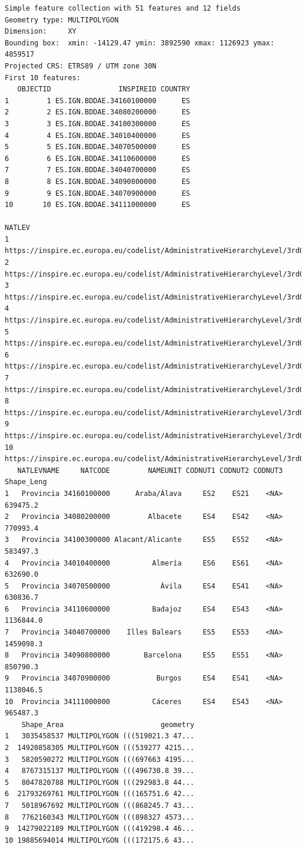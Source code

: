 \documentclass[
  letterpaper,
  DIV=11,
  numbers=noendperiod]{scrreprt}
\begin{document}
\begin{verbatim}
Simple feature collection with 51 features and 12 fields
Geometry type: MULTIPOLYGON
Dimension:     XY
Bounding box:  xmin: -14129.47 ymin: 3892590 xmax: 1126923 ymax: 4859517
Projected CRS: ETRS89 / UTM zone 30N
First 10 features:
   OBJECTID                INSPIREID COUNTRY
1         1 ES.IGN.BDDAE.34160100000      ES
2         2 ES.IGN.BDDAE.34080200000      ES
3         3 ES.IGN.BDDAE.34100300000      ES
4         4 ES.IGN.BDDAE.34010400000      ES
5         5 ES.IGN.BDDAE.34070500000      ES
6         6 ES.IGN.BDDAE.34110600000      ES
7         7 ES.IGN.BDDAE.34040700000      ES
8         8 ES.IGN.BDDAE.34090800000      ES
9         9 ES.IGN.BDDAE.34070900000      ES
10       10 ES.IGN.BDDAE.34111000000      ES
                                                                        NATLEV
1  https://inspire.ec.europa.eu/codelist/AdministrativeHierarchyLevel/3rdOrder
2  https://inspire.ec.europa.eu/codelist/AdministrativeHierarchyLevel/3rdOrder
3  https://inspire.ec.europa.eu/codelist/AdministrativeHierarchyLevel/3rdOrder
4  https://inspire.ec.europa.eu/codelist/AdministrativeHierarchyLevel/3rdOrder
5  https://inspire.ec.europa.eu/codelist/AdministrativeHierarchyLevel/3rdOrder
6  https://inspire.ec.europa.eu/codelist/AdministrativeHierarchyLevel/3rdOrder
7  https://inspire.ec.europa.eu/codelist/AdministrativeHierarchyLevel/3rdOrder
8  https://inspire.ec.europa.eu/codelist/AdministrativeHierarchyLevel/3rdOrder
9  https://inspire.ec.europa.eu/codelist/AdministrativeHierarchyLevel/3rdOrder
10 https://inspire.ec.europa.eu/codelist/AdministrativeHierarchyLevel/3rdOrder
   NATLEVNAME     NATCODE         NAMEUNIT CODNUT1 CODNUT2 CODNUT3 Shape_Leng
1   Provincia 34160100000      Araba/Álava     ES2    ES21    <NA>   639475.2
2   Provincia 34080200000         Albacete     ES4    ES42    <NA>   770993.4
3   Provincia 34100300000 Alacant/Alicante     ES5    ES52    <NA>   583497.3
4   Provincia 34010400000          Almería     ES6    ES61    <NA>   632690.0
5   Provincia 34070500000            Ávila     ES4    ES41    <NA>   630836.7
6   Provincia 34110600000          Badajoz     ES4    ES43    <NA>  1136844.0
7   Provincia 34040700000    Illes Balears     ES5    ES53    <NA>  1459098.3
8   Provincia 34090800000        Barcelona     ES5    ES51    <NA>   850790.3
9   Provincia 34070900000           Burgos     ES4    ES41    <NA>  1138046.5
10  Provincia 34111000000          Cáceres     ES4    ES43    <NA>   965487.3
    Shape_Area                       geometry
1   3035458537 MULTIPOLYGON (((519021.3 47...
2  14920858305 MULTIPOLYGON (((539277 4215...
3   5820590272 MULTIPOLYGON (((697663 4195...
4   8767315137 MULTIPOLYGON (((496730.8 39...
5   8047820788 MULTIPOLYGON (((292983.8 44...
6  21793269761 MULTIPOLYGON (((165751.6 42...
7   5018967692 MULTIPOLYGON (((868245.7 43...
8   7762160343 MULTIPOLYGON (((898327 4573...
9  14279022189 MULTIPOLYGON (((419298.4 46...
10 19885694014 MULTIPOLYGON (((172175.6 43...
\end{verbatim}
\end{document}
